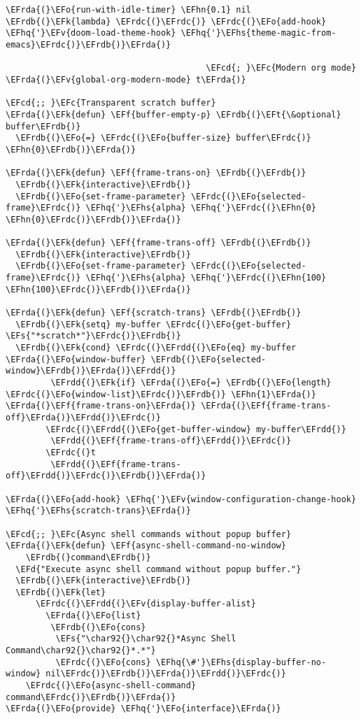 \documentclass[a4wide,10pt]{article}
\newcommand{\EFc}[1]{\textcolor{EFc}{#1}} %
\newcommand{\EFcd}[1]{\textcolor{EFcd}{#1}} %
\newcommand{\EFs}[1]{\textcolor{EFs}{#1}} %
\newcommand{\EFd}[1]{\textcolor{EFd}{#1}} %
\newcommand{\EFk}[1]{\textcolor{EFk}{#1}} %
\newcommand{\EFf}[1]{\textcolor{EFf}{#1}} %
\newcommand{\EFv}[1]{\textcolor{EFv}{#1}} %
\newcommand{\EFt}[1]{\textcolor{EFt}{#1}} %
\newcommand{\EFo}[1]{\textcolor{EFo}{#1}} %
\newcommand{\EFhn}[1]{\textcolor{EFhn}{\textbf{#1}}} %
\newcommand{\EFhq}[1]{\textcolor{EFhq}{#1}} %
\newcommand{\EFhs}[1]{\textcolor{EFhs}{#1}} %
\newcommand{\EFrda}[1]{\textcolor{EFrda}{#1}} %
\newcommand{\EFrdb}[1]{\textcolor{EFrdb}{#1}} %
\newcommand{\EFrdc}[1]{\textcolor{EFrdc}{#1}} %
\newcommand{\EFrdd}[1]{\textcolor{EFrdd}{#1}} %
\begin{document}
\begin{Code}
\begin{Verbatim}
\EFrda{(}\EFo{run-with-idle-timer} \EFhn{0.1} nil \EFrdb{(}\EFk{lambda} \EFrdc{(}\EFrdc{)} \EFrdc{(}\EFo{add-hook} \EFhq{'}\EFv{doom-load-theme-hook} \EFhq{'}\EFhs{theme-magic-from-emacs}\EFrdc{)}\EFrdb{)}\EFrda{)}

                                        \EFcd{; }\EFc{Modern org mode}
\EFrda{(}\EFv{global-org-modern-mode} t\EFrda{)}

\EFcd{;; }\EFc{Transparent scratch buffer}
\EFrda{(}\EFk{defun} \EFf{buffer-empty-p} \EFrdb{(}\EFt{\&optional} buffer\EFrdb{)}
  \EFrdb{(}\EFo{=} \EFrdc{(}\EFo{buffer-size} buffer\EFrdc{)} \EFhn{0}\EFrdb{)}\EFrda{)}

\EFrda{(}\EFk{defun} \EFf{frame-trans-on} \EFrdb{(}\EFrdb{)}
  \EFrdb{(}\EFk{interactive}\EFrdb{)}
  \EFrdb{(}\EFo{set-frame-parameter} \EFrdc{(}\EFo{selected-frame}\EFrdc{)} \EFhq{'}\EFhs{alpha} \EFhq{'}\EFrdc{(}\EFhn{0} \EFhn{0}\EFrdc{)}\EFrdb{)}\EFrda{)}

\EFrda{(}\EFk{defun} \EFf{frame-trans-off} \EFrdb{(}\EFrdb{)}
  \EFrdb{(}\EFk{interactive}\EFrdb{)}
  \EFrdb{(}\EFo{set-frame-parameter} \EFrdc{(}\EFo{selected-frame}\EFrdc{)} \EFhq{'}\EFhs{alpha} \EFhq{'}\EFrdc{(}\EFhn{100} \EFhn{100}\EFrdc{)}\EFrdb{)}\EFrda{)}

\EFrda{(}\EFk{defun} \EFf{scratch-trans} \EFrdb{(}\EFrdb{)}
  \EFrdb{(}\EFk{setq} my-buffer \EFrdc{(}\EFo{get-buffer} \EFs{"*scratch*"}\EFrdc{)}\EFrdb{)}
  \EFrdb{(}\EFk{cond} \EFrdc{(}\EFrdd{(}\EFo{eq} my-buffer \EFrda{(}\EFo{window-buffer} \EFrdb{(}\EFo{selected-window}\EFrdb{)}\EFrda{)}\EFrdd{)}
         \EFrdd{(}\EFk{if} \EFrda{(}\EFo{=} \EFrdb{(}\EFo{length} \EFrdc{(}\EFo{window-list}\EFrdc{)}\EFrdb{)} \EFhn{1}\EFrda{)} \EFrda{(}\EFf{frame-trans-on}\EFrda{)} \EFrda{(}\EFf{frame-trans-off}\EFrda{)}\EFrdd{)}\EFrdc{)}
        \EFrdc{(}\EFrdd{(}\EFo{get-buffer-window} my-buffer\EFrdd{)}
         \EFrdd{(}\EFf{frame-trans-off}\EFrdd{)}\EFrdc{)}
        \EFrdc{(}t
         \EFrdd{(}\EFf{frame-trans-off}\EFrdd{)}\EFrdc{)}\EFrdb{)}\EFrda{)}

\EFrda{(}\EFo{add-hook} \EFhq{'}\EFv{window-configuration-change-hook} \EFhq{'}\EFhs{scratch-trans}\EFrda{)}

\EFcd{;; }\EFc{Async shell commands without popup buffer}
\EFrda{(}\EFk{defun} \EFf{async-shell-command-no-window}
    \EFrdb{(}command\EFrdb{)}
  \EFd{"Execute async shell command without popup buffer."}
  \EFrdb{(}\EFk{interactive}\EFrdb{)}
  \EFrdb{(}\EFk{let}
      \EFrdc{(}\EFrdd{(}\EFv{display-buffer-alist}
        \EFrda{(}\EFo{list}
         \EFrdb{(}\EFo{cons}
          \EFs{"\char92{}\char92{}*Async Shell Command\char92{}\char92{}*.*"}
          \EFrdc{(}\EFo{cons} \EFhq{\#'}\EFhs{display-buffer-no-window} nil\EFrdc{)}\EFrdb{)}\EFrda{)}\EFrdd{)}\EFrdc{)}
    \EFrdc{(}\EFo{async-shell-command} command\EFrdc{)}\EFrdb{)}\EFrda{)}
\EFrda{(}\EFo{provide} \EFhq{'}\EFo{interface}\EFrda{)}
\end{Verbatim}
\end{Code}
\end{document}
